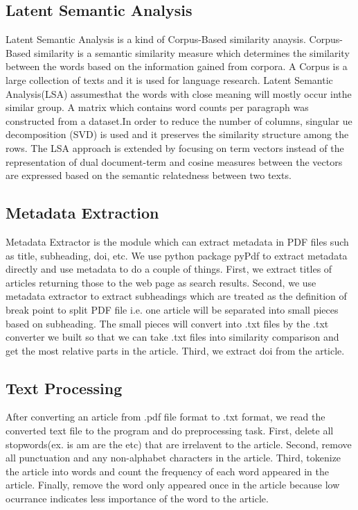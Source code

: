 \subsection{Latent Semantic Analysis}
Latent Semantic Analysis is a kind of Corpus-Based similarity anaysis. Corpus-Based similarity is a semantic similarity measure which determines the similarity between the words based on the information gained from corpora. A Corpus is a large collection of texts and it is used for language research. Latent Semantic Analysis(LSA) assumesthat the words with close meaning will mostly occur inthe similar group. A matrix which contains word counts per paragraph was constructed from a  dataset.In order to reduce the number of columns, singular ue decomposition (SVD) is used and it preserves the similarity structure among the rows. The LSA approach is extended by focusing on term vectors instead of the representation of dual document-term and cosine measures between the vectors are expressed based on the semantic relatedness between two texts.
 
\subsection{Metadata Extraction}
Metadata Extractor is the module which can extract metadata in PDF files such as title, subheading, doi, etc. We use python package pyPdf to extract metadata directly and use metadata to do a couple of things. First, we extract titles of articles returning those to the web page as search results. Second, we use metadata extractor to extract subheadings which are treated as the definition of break point to split PDF file i.e. one article will be separated into small pieces based on subheading. The small pieces will convert into .txt files by the .txt converter we built so that we can take .txt files into similarity comparison and get the most relative parts in the article. Third, we extract doi from the article. 

 \subsection{Text Processing}
 After converting an article from .pdf file format to .txt format, we read the converted text file to the program and do preprocessing task. First, delete all stopwords(ex. is am are the etc) that are irrelavent to the article. Second, remove all punctuation and any non-alphabet characters  in the article. Third, tokenize the article into words and count the frequency of each word appeared in the article. Finally, remove the word only appeared once in the article because low ocurrance indicates less importance of the word to the article.

